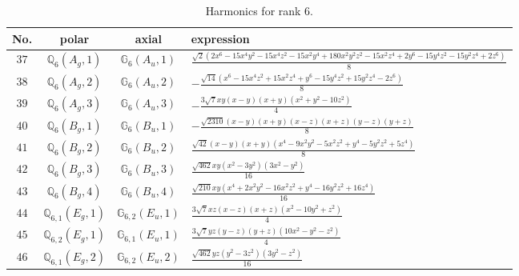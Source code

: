 \documentclass[fleqn,8pt,landscape]{jsarticle}
\begin{document}
\begin{table}[ht!]
\begin{center}
\caption{Harmonics for rank 6.}
\renewcommand{\arraystretch}{1.3}
\begin{tabular}{cccl} \hline \hline
No. & polar & axial & expression \\ \hline
$ 37 $ & $ \mathbb{Q}_{6}(A_{g},1) $ & $ \mathbb{G}_{6}(A_{u},1) $ & $ \frac{\sqrt{2} \left(2 x^{6} - 15 x^{4} y^{2} - 15 x^{4} z^{2} - 15 x^{2} y^{4} + 180 x^{2} y^{2} z^{2} - 15 x^{2} z^{4} + 2 y^{6} - 15 y^{4} z^{2} - 15 y^{2} z^{4} + 2 z^{6}\right)}{8} $ \\
$ 38 $ & $ \mathbb{Q}_{6}(A_{g},2) $ & $ \mathbb{G}_{6}(A_{u},2) $ & $ - \frac{\sqrt{14} \left(x^{6} - 15 x^{4} z^{2} + 15 x^{2} z^{4} + y^{6} - 15 y^{4} z^{2} + 15 y^{2} z^{4} - 2 z^{6}\right)}{8} $ \\
$ 39 $ & $ \mathbb{Q}_{6}(A_{g},3) $ & $ \mathbb{G}_{6}(A_{u},3) $ & $ - \frac{3 \sqrt{7} x y \left(x - y\right) \left(x + y\right) \left(x^{2} + y^{2} - 10 z^{2}\right)}{4} $ \\
$ 40 $ & $ \mathbb{Q}_{6}(B_{g},1) $ & $ \mathbb{G}_{6}(B_{u},1) $ & $ - \frac{\sqrt{2310} \left(x - y\right) \left(x + y\right) \left(x - z\right) \left(x + z\right) \left(y - z\right) \left(y + z\right)}{8} $ \\
$ 41 $ & $ \mathbb{Q}_{6}(B_{g},2) $ & $ \mathbb{G}_{6}(B_{u},2) $ & $ \frac{\sqrt{42} \left(x - y\right) \left(x + y\right) \left(x^{4} - 9 x^{2} y^{2} - 5 x^{2} z^{2} + y^{4} - 5 y^{2} z^{2} + 5 z^{4}\right)}{8} $ \\
$ 42 $ & $ \mathbb{Q}_{6}(B_{g},3) $ & $ \mathbb{G}_{6}(B_{u},3) $ & $ \frac{\sqrt{462} x y \left(x^{2} - 3 y^{2}\right) \left(3 x^{2} - y^{2}\right)}{16} $ \\
$ 43 $ & $ \mathbb{Q}_{6}(B_{g},4) $ & $ \mathbb{G}_{6}(B_{u},4) $ & $ \frac{\sqrt{210} x y \left(x^{4} + 2 x^{2} y^{2} - 16 x^{2} z^{2} + y^{4} - 16 y^{2} z^{2} + 16 z^{4}\right)}{16} $ \\
$ 44 $ & $ \mathbb{Q}_{6,1}(E_{g},1) $ & $ \mathbb{G}_{6,2}(E_{u},1) $ & $ \frac{3 \sqrt{7} x z \left(x - z\right) \left(x + z\right) \left(x^{2} - 10 y^{2} + z^{2}\right)}{4} $ \\
$ 45 $ & $ \mathbb{Q}_{6,2}(E_{g},1) $ & $ \mathbb{G}_{6,1}(E_{u},1) $ & $ \frac{3 \sqrt{7} y z \left(y - z\right) \left(y + z\right) \left(10 x^{2} - y^{2} - z^{2}\right)}{4} $ \\
$ 46 $ & $ \mathbb{Q}_{6,1}(E_{g},2) $ & $ \mathbb{G}_{6,2}(E_{u},2) $ & $ \frac{\sqrt{462} y z \left(y^{2} - 3 z^{2}\right) \left(3 y^{2} - z^{2}\right)}{16} $ \\

\end{tabular}
\end{center}
\end{table}
\end{document}
